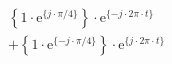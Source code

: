 \[
\begin{split}
&  \left \{ 1 \cdot \textrm{e}^{\{  j \cdot \pi/4 \}} \right \} \cdot \textrm{e}^{\{- j \cdot 2\pi \cdot t \}}\\
&+ \left \{ 1 \cdot \textrm{e}^{\{ -j \cdot \pi/4 \}} \right \} \cdot \textrm{e}^{\{  j \cdot 2\pi \cdot t \}}
\end{split}
\]
